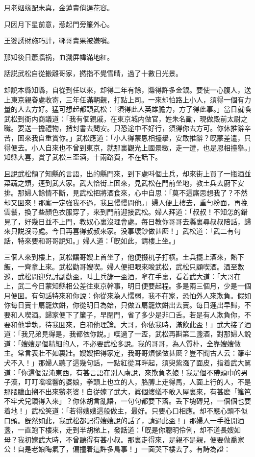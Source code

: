 月老姻缘配未真，金蓮賣俏逞花容。

只因月下星前意，惹起門旁簾外心。

王婆誘財施巧計，鄆哥賣果被嫌嗔。

那知後日蕭牆祸，血濺屏幃滿地紅。

話説武松自從搬離哥家，撚指不覺雪晴，過了十數日光景。

却說本縣知縣，自從到任以來，却得二年有餘，賺得許多金銀。要使一心腹人，送上東京親眷處收寄，三年任滿朝覲，打點上司。一來却怕路上小人，須得一個有力量的人去方好。猛可想起都頭武松：「須得此人英雄膽力，方了得此事。」當日就喚武松到衙内商議道：「我有個親戚，在東京城内做官，姓朱名勔，現做殿前太尉之職。要送一擔禮物，捎封書去問安。只恐途中不好行，須得你去方可。你休推辭辛苦，囬來我自重賞你。」武松應道：「小人得蒙恩相擡擧，安敢推辭？旣蒙差遣，只得便去。小人自來也不曾到東京，就那裏觀光上國景緻，走一遭，也是恩相擡擧。」知縣大喜，賞了武松三盃酒，十兩路費，不在話下。

且說武松領了知縣的言語，出的縣門來，到下處呌個土兵，却來街上買了一瓶酒並菜蔬之類，逕到武大家。武大恰街上囬來，見武松在門前坐地，教土兵去廚下安排。那婦人餘情不斷，見武松把將酒食來，心中自思：「莫不這廝思想我了？不然却又囬來！那廝一定強我不過，我且慢慢問他。」婦人便上樓去，重勻粉面，再挽雲鬟，換了些顔色衣服穿了，來到門前迎接武松。婦人拜道：「叔叔！不知怎的錯見了，好幾日並不上門，教奴心裏沒理會處。每日教你哥哥去縣裏尋叔叔陪話，歸來只説沒尋處。今日再喜得叔叔來家。没事壞鈔做甚麽！」武松道：「武二有句話，特來要和哥哥說知。」婦人道：「旣如此，請樓上坐。」

三個人來到樓上，武松讓哥嫂上首坐了，他便掇杌子打横。土兵擺上酒來，熱下飯，一齊拿上來。武松勸哥嫂喫。婦人便把眼來睃武松，武松只顧喫酒。酒至數巡，武松問迎兒討副勸盃，叫土兵篩一盃酒，拿在手裏，看着武大道：「大哥在上，武二今日蒙知縣相公差往東京幹事，明日便要起程。多是兩三個月，少是一個月便囬。有句話特來和你說：你從來為人懦弱，我不在家，恐怕外人來欺負。假如你每日賣十扇籠炊餅，你從明日為始，只做五扇籠炊餅出去賣。每日遲出早歸，不要和人喫酒。歸家便下了簾子，早閉門，省了多少是非口舌。若是有人欺負你，不要和他爭執，待我囬來，自和他理論。大哥，你依我時，滿飲此盃！」武大接了酒道：「我兄弟見得是，我都依你説。」喫過了一盃，武松再斟第二盞酒，對那婦人說道：「嫂嫂是個精細的人，不必要武松多說。我的哥哥，為人質朴，全靠嫂嫂做主。常言表壯不如裏壯。嫂嫂把得家定，我哥哥煩惱做甚麽？豈不聞古人云：籬牢犬不入！」那婦人聽了這幾句話，一點紅從耳畔起，須臾紫漒了面皮，指着武大駡道：「你這個混沌東西，有甚言語在别人䖏說，來欺負老娘！我是個不帶頭巾的男子漢，叮叮噹噹響的婆娘，拳頭上也立的人，胳膊上走得馬，人面上行的人，不是那腲膿血搠不出來鱉老婆！自従嫁了武大，眞個螻蟻不敢入屋裏來，有甚麽「籬笆不牢犬兒鑽得入來」？你休胡言亂語，一句句都要下落。丢下塊磚兒，一個個也要着地！」武松笑道：「若得嫂嫂這般做主，最好。只要心口相應。却不應心頭不似口頭。旣然如此，我武松都記得嫂嫂說的話了，請過此盃！」那婦人一手推開酒盞，一直跑下樓來，走到半胡梯上，發話道：「旣是你聰明伶俐，却不道長嫂如母？我初嫁武大時，不曾聽得有甚小叔。那裏走得來，是親不是親，便要做喬家公！自是老娘晦氣了，偏撞着這許多鳥事！」一面哭下樓去了。有詩為證：

